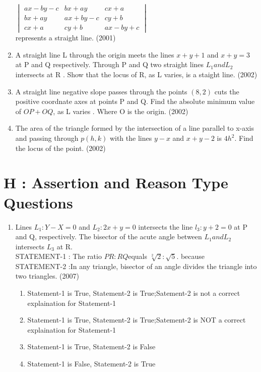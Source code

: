 \documentclass[12pt]{article}
\begin{document}
\begin{enumerate}
$\begin{vmatrix}
 ax-by-c & bx+ay   & cx+a\\
 bx+ay   & ax+by-c & cy+b\\
 cx+a    & cy+b    & ax-by+c
\end{vmatrix}$ \\
represents a straight line.    (2001)
\item A straight line L through the origin meets the lines $x+y+1$ and $x+y=3$ at P and Q respectively. Through  P and Q two straight lines $L_1 and L_2$ intersects at R . Show that the locus of R, as L varies, is a staight line. (2002)\\
\item A straight line negative slope passes through the points $(8,2)$ cuts the positive 
coordnate axes at points P and Q. Find the absolute minimum value of $OP+OQ$, as L varies . Where O is the origin. (2002)\\
\item The area of the triangle formed by the intersection of a line parallel to x-axis and passing through $p(h,k)$ with the lines $y-x$ and $x+y-2$ is $4h^2$. Find the locus of the point. (2002)\\
\end{enumerate}

\section*{H   : Assertion and Reason Type Questions}

\begin{enumerate}
\item Lines $L_1: Y-X=0$ and $L_2 :2x+y=0$ intersects the line $l_3:y+2=0$ at P and Q, respectively. The bisector of the acute angle between $L_1 and L_2$ intersects $L_3$ at R.\\
STATEMENT-1 : The ratio $PR:RQ$equals $\sqrt[2]{2}:\sqrt{5}$. because \\
STATEMENT-2 :In any triangle, bisector of an angle divides the triangle into two triangles. (2007)
\begin{enumerate}
\item Statement-1 is True, Statement-2 is True;Satement-2 is not a correct explaination for Statement-1
\item Statement-1 is True, Statement-2 is True;Satement-2 is NOT a correct explaination for Statement-1
\item Statement-1 is True, Statement-2 is False
\item Statement-1 is False, Statement-2 is True
\end{enumerate}
\end{enumerate}
\end{document}
